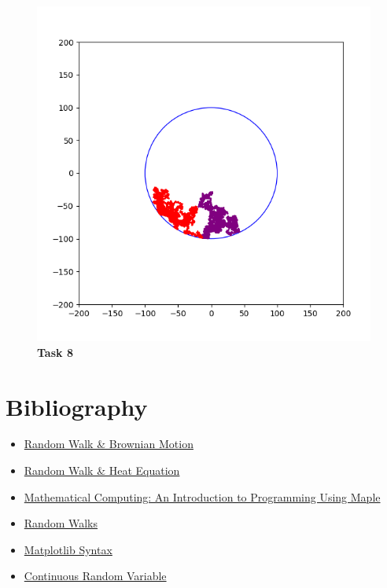 \documentclass{article}
\begin{document}
    \begin{figure}[H]
        \includegraphics[width=15cm]{Graphs/task8.png}
        \centering
        \caption{\textbf{Task 8}}
    \end{figure}
    
    \section*{Bibliography}
    \begin{itemize}
        \item \href{http://web.mit.edu8.334/www/grades/projects/projects17/OscarMickelin/brownian.html}{Random Walk \& Brownian Motion}
        \item \href{https://www.math.uchicago.edu/~lawler/reu.pdf}{Random Walk \& Heat Equation}
        \item \href{https://books.google.com.pk/books?id=U2CrDY1MH5kC&pg=PA374&lpg=PA374&dq=how+to+reflect+a+point+from+the+boundary+of+circle+in+random+walk&source=bl&ots=_rt0N7oorr&sig=ACfU3U1LqlLgMpwvczXGymF0JxRteDJoRw&hl=en&sa=X&ved=2ahUKEwjP0PnOn47qAhUMqxoKHRbkCfwQ6AEwC3oECAkQAQ#v=onepage&q=how%20to%20reflect%20a%20point%20from%20the%20boundary%20of%20circle%20in%20random%20walk&f=false}{Mathematical Computing: An Introduction to Programming Using Maple}
        \item \href{http://physics.gu.se/~frtbm/joomla/media/mydocs/LennartSjogren/kap2.pdf}{Random Walks}
        \item \href{https://matplotlib.org/tutorials/introductory/pyplot.html}{Matplotlib Syntax}
        \item \href{https://docs.scipy.org/doc/numpy-1.15.0/reference/generated/numpy.random.uniform.html}{Continuous Random Variable}
    \end{itemize}
\end{document}

